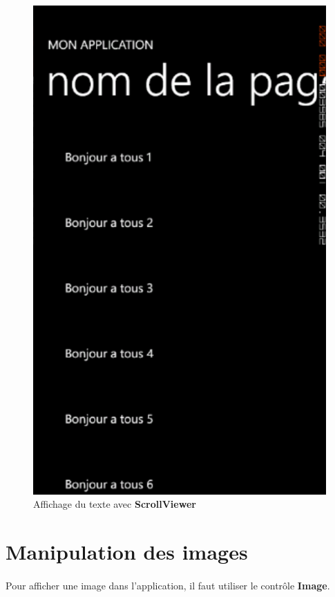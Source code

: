 \documentclass[twoside,UTF8]{EPURapport}
\begin{document}
\begin{figure}[H]
	\center
	\includegraphics[scale=0.3]{images/scrollviewer.png}
	\caption{Affichage du texte avec \textbf{ScrollViewer}}
\end{figure}
		
	\section{Manipulation des images}
	
\paragraph{}
Pour afficher une image dans l'application, il faut utiliser le contrôle \textbf{Image}.
\end{document}
